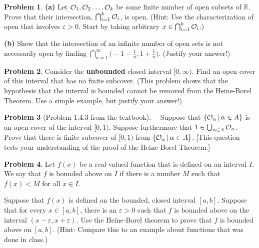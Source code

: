 \documentclass[12pt]{article}
\newcommand{\eps}{\varepsilon}
\newcommand{\R}{{\mathbb R}}
\theoremstyle{definition}
\newtheorem{problem}{Problem}
\newenvironment{answer}{\par\medskip\bgroup\color{darkblue}}{\egroup\par\medskip}
\begin{document}
\begin{answer}
\end{answer}



\begin{problem}
\textbf{(a)} Let ${\mathcal O}_1,{\mathcal O}_2\dots,{\mathcal O}_k$ be some finite number of open subsets of
$\R$.  Prove that their intersection, $\bigcap_{i=1}^k{\mathcal O}_i$, is open.  (Hint: Use the characterization
of open that involves $\eps>0$.  Start by taking arbitrary $x\in\bigcap_{i=1}^k{\mathcal O}_i$.)

\textbf{(b)} Show that the intersection of an infinite number of open sets is not necessarily open
by finding $\bigcap_{n=1}^\infty\big(-1-\frac{1}{n},1+\frac{1}{n}\big)$. (Justify your answer!)
\end{problem}
\begin{answer}
\end{answer}


\begin{problem}
Consider the \textbf{unbounded} closed interval $[0,\infty)$.  Find an open cover of this
interval that has no finite subcover.  (This problem shows that the hypothesis that the interval is 
bounded cannot be removed from the Heine-Borel Theorem. Use a simple example, but justify your answer!)
\end{problem}

\begin{answer}
\end{answer}


\begin{problem}
[Problem 1.4.3 from the textbook]\ \ Suppose that $\{{\mathcal O}_\alpha\,|\,\alpha\in A\}$ is an open cover
of the interval $[0,1)$.  Suppose furthermore that $1\in\bigcup_{\alpha\in A}{\mathcal O}_\alpha$.
Prove that there is finite subcover of $[0,1)$ from $\{{\mathcal O}_\alpha\,|\,\alpha\in A\}$.
[This question tests your understanding of the proof of the Heine-Borel Theorem.]
\end{problem}

\begin{answer}
\end{answer}


\begin{problem}
Let $f(x)$ be a real-valued function that is defined on an interval $I$.  We say that $f$ is
bounded above on $I$ if there is a number $M$ such that $f(x)<M$ for all $x\in I$.

Suppose that $f(x)$ is defined on the bounded, closed interval $[a,b]$.  Suppose that for
every $x\in[a,b]$, there is an $\eps>0$ such that $f$ is bounded above on the
interval $(x-\eps,x+\eps)$.  Use the Heine-Borel theorem to prove that
$f$ is bounded above on $[a,b]$.  (Hint: Compare this to an example about functions 
that was done in class.)
\end{problem}

\begin{answer}
\end{answer}
\end{document}
